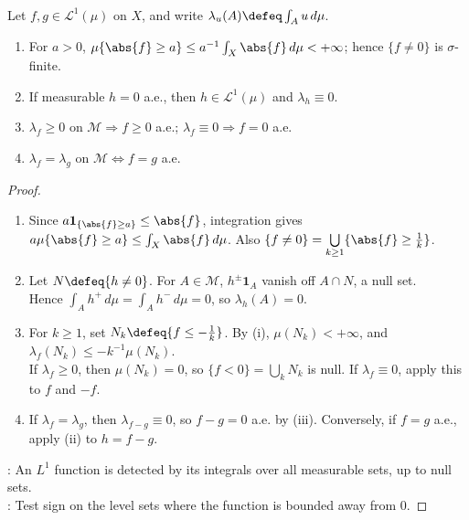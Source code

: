 \begin{proposition} \label{prop:l1-level-sets-null-and-indefinite-integrals} \\
Let $f,g\in\mathscr{L}^1(\mu)$ on $X$, and write $\lambda_u(A)\defeq\int_Au\,d\mu$.
\begin{enumerate}[label=(\roman*)]
\setlength{\itemsep}{0pt}
\item For $a>0$, $\mu\{\abs{f}\geq a\}\leq a^{-1}\int_X\abs{f}\,d\mu<+\infty$; hence $\{f\neq0\}$ is $\sigma$-finite.
\item If measurable $h=0$ a.e., then $h\in\mathscr{L}^1(\mu)$ and $\lambda_h\equiv0$.
\item $\lambda_f\geq0$ on $\mathcal{M}\Longrightarrow f\geq0$ a.e.; $\lambda_f\equiv0\Longrightarrow f=0$ a.e.
\item $\lambda_f=\lambda_g$ on $\mathcal{M}\Longleftrightarrow f=g$ a.e.
\end{enumerate}
\begin{proof}
\begin{enumerate}[label=(\roman*)]
\setlength{\itemsep}{0pt}
\item Since $a\mathbf{1}_{\{\abs{f}\geq a\}}\leq\abs{f}$, integration gives $a\mu\{\abs{f}\geq a\}\leq\int_X\abs{f}\,d\mu$. Also $\{f\neq0\}=\bigcup\limits_{k\geq1}\{\abs{f}\geq\frac{1}{k}\}$.
\item Let $N\defeq\{h\neq0\}$. For $A\in\mathcal{M}$, $h^\pm\mathbf{1}_A$ vanish off $A\cap N$, a null set.\\
Hence $\int_Ah^+\,d\mu=\int_Ah^-\,d\mu=0$, so $\lambda_h(A)=0$.
\item For $k\geq1$, set $N_k\defeq\{f\leq-\frac{1}{k}\}$. By (i), $\mu(N_k)<+\infty$, and $\lambda_f(N_k)\leq-k^{-1}\mu(N_k)$.\\
If $\lambda_f\geq0$, then $\mu(N_k)=0$, so $\{f<0\}=\bigcup\limits_kN_k$ is null. If $\lambda_f\equiv0$, apply this to $f$ and $-f$.
\item If $\lambda_f=\lambda_g$, then $\lambda_{f-g}\equiv0$, so $f-g=0$ a.e. by (iii). Conversely, if $f=g$ a.e., apply (ii) to $h=f-g$.
\end{enumerate}
: An $L^1$ function is detected by its integrals over all measurable sets, up to null sets.\\
: Test sign on the level sets where the function is bounded away from $0$.
\end{proof}
\end{proposition}

